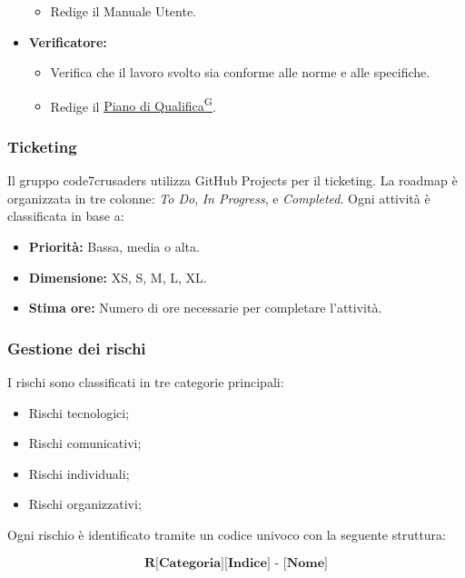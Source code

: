\begin{itemize}
\begin{itemize}
        \item Redige il Manuale Utente.
    \end{itemize}
    \item \textbf{Verificatore:}
    \begin{itemize}
        \item Verifica che il lavoro svolto sia conforme alle norme e alle specifiche.
        \item Redige il \href{https://code7crusaders.github.io/docs/PB/documentazione_interna/glossario.html#piano-di-qualifica}{Piano di Qualifica\textsuperscript{G}}.
    \end{itemize}
\end{itemize}

\subsubsection{Ticketing}
Il gruppo code7crusaders utilizza GitHub Projects per il ticketing. La roadmap è organizzata in tre colonne: \textit{To Do}, \textit{In Progress}, e \textit{Completed}. Ogni attività è classificata in base a:
\begin{itemize}
    \item \textbf{Priorità:} Bassa, media o alta.
    \item \textbf{Dimensione:} XS, S, M, L, XL.
    \item \textbf{Stima ore:} Numero di ore necessarie per completare l’attività.
\end{itemize}

\subsubsection{Gestione dei rischi}
I rischi sono classificati in tre categorie principali:
\begin{itemize}
    \item Rischi tecnologici;
    \item Rischi comunicativi;
    \item Rischi individuali;
    \item Rischi organizzativi;
\end{itemize}

Ogni rischio è identificato tramite un codice univoco con la seguente struttura:

\[
\textbf{R[Categoria][Indice] - [Nome]}
\]

